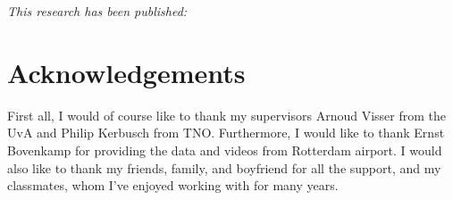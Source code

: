 \documentclass[11pt, a4paper]{book}
\begin{document}
\begingroup
\textit{This research has been published:} 
\renewcommand{\chapter}[2]{}
\endgroup
\graphicspath{{.}{../results}}
\newpage

\section{Acknowledgements}
First all, I would of course like to thank my supervisors Arnoud Visser from the UvA and Philip Kerbusch from TNO. Furthermore, I would like to thank Ernst Bovenkamp for providing the data and videos from Rotterdam airport. I would also like to thank my friends, family, and boyfriend for all the support, and my classmates, whom I've enjoyed working with for many years.
\newpage
\tableofcontents
\newpage

\mainmatter
\end{document}
